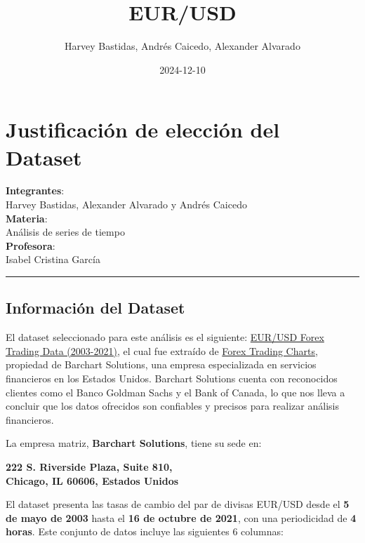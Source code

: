 \documentclass[
]{book}
\title{EUR/USD}
\author{Harvey Bastidas, Andrés Caicedo, Alexander Alvarado}
\date{2024-12-10}
\begin{document}
\maketitle

{
\setcounter{tocdepth}{1}
\tableofcontents
}
\chapter{Justificación de elección del Dataset}\label{justificaciuxf3n-de-elecciuxf3n-del-dataset}

\textbf{Integrantes}:\\
Harvey Bastidas, Alexander Alvarado y Andrés Caicedo\\
\textbf{Materia}:\\
Análisis de series de tiempo\\
\textbf{Profesora}:\\
Isabel Cristina García

\begin{center}\rule{0.5\linewidth}{0.5pt}\end{center}

\section{Información del Dataset}\label{informaciuxf3n-del-dataset}

El dataset seleccionado para este análisis es el siguiente: \href{https://www.kaggle.com/datasets/chandrimad31/eurusd-forex-trading-data-20032021}{EUR/USD Forex Trading Data (2003-2021)}, el cual fue extraído de \href{https://forex.tradingcharts.com/}{Forex Trading Charts}, propiedad de Barchart Solutions, una empresa especializada en servicios financieros en los Estados Unidos. Barchart Solutions cuenta con reconocidos clientes como el Banco Goldman Sachs y el Bank of Canada, lo que nos lleva a concluir que los datos ofrecidos son confiables y precisos para realizar análisis financieros.

La empresa matriz, \textbf{Barchart Solutions}, tiene su sede en:

\textbf{222 S. Riverside Plaza, Suite 810,\\
Chicago, IL 60606, Estados Unidos}

El dataset presenta las tasas de cambio del par de divisas EUR/USD desde el \textbf{5 de mayo de 2003} hasta el \textbf{16 de octubre de 2021}, con una periodicidad de \textbf{4 horas}. Este conjunto de datos incluye las siguientes 6 columnas:
\end{document}
